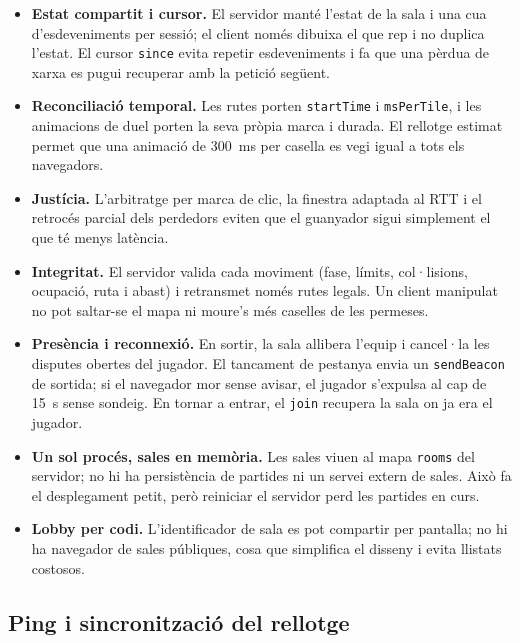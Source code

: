 \documentclass[11pt,a4paper]{article}
\begin{document}
\begin{itemize}
  \item \textbf{Estat compartit i cursor.} El servidor manté l'estat de la sala i una
        cua d'esdeveniments per sessió; el client només dibuixa el que rep i no
        duplica l'estat. El cursor \texttt{since} evita repetir esdeveniments i fa que
        una pèrdua de xarxa es pugui recuperar amb la petició següent.
  \item \textbf{Reconciliació temporal.} Les rutes porten \texttt{startTime} i
        \texttt{msPerTile}, i les animacions de duel porten la seva pròpia marca i
        durada. El rellotge estimat permet que una animació de 300~ms per casella es
        vegi igual a tots els navegadors.
  \item \textbf{Justícia.} L'arbitratge per marca de clic, la finestra adaptada al RTT
        i el retrocés parcial dels perdedors eviten que el guanyador sigui simplement
        el que té menys latència.
  \item \textbf{Integritat.} El servidor valida cada moviment (fase, límits,
        col·lisions, ocupació, ruta i abast) i retransmet només rutes legals. Un client
        manipulat no pot saltar-se el mapa ni moure's més caselles de les permeses.
  \item \textbf{Presència i reconnexió.} En sortir, la sala allibera l'equip i cancel·la
        les disputes obertes del jugador. El tancament de pestanya envia un
        \texttt{sendBeacon} de sortida; si el navegador mor sense avisar, el jugador
        s'expulsa al cap de 15~s sense sondeig. En tornar a entrar, el \texttt{join}
        recupera la sala on ja era el jugador.
  \item \textbf{Un sol procés, sales en memòria.} Les sales viuen al mapa
        \texttt{rooms} del servidor; no hi ha persistència de partides ni un servei
        extern de sales. Això fa el desplegament petit, però reiniciar el servidor
        perd les partides en curs.
  \item \textbf{Lobby per codi.} L'identificador de sala es pot compartir per pantalla;
        no hi ha navegador de sales públiques, cosa que simplifica el disseny i evita
        llistats costosos.
\end{itemize}

\subsection{Ping i sincronització del rellotge}
\label{sec:ping}
\end{document}
